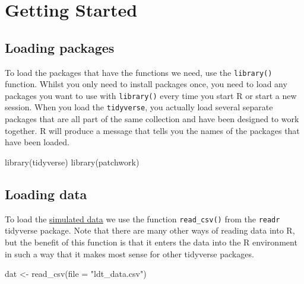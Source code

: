 \documentclass[
  english,
  doc,floatsintext]{apa6}
\newenvironment{Shaded}{\begin{snugshade}}{\end{snugshade}}
\newcommand{\AttributeTok}[1]{\textcolor[rgb]{0.77,0.63,0.00}{#1}}
\newcommand{\FunctionTok}[1]{\textcolor[rgb]{0.00,0.00,0.00}{#1}}
\newcommand{\NormalTok}[1]{#1}
\newcommand{\OtherTok}[1]{\textcolor[rgb]{0.56,0.35,0.01}{#1}}
\newcommand{\StringTok}[1]{\textcolor[rgb]{0.31,0.60,0.02}{#1}}
\begin{document}
\hypertarget{getting-started}{%
\section{Getting Started}\label{getting-started}}

\hypertarget{loading-packages}{%
\subsection{Loading packages}\label{loading-packages}}

To load the packages that have the functions we need, use the \texttt{library()} function. Whilst you only need to install packages once, you need to load any packages you want to use with \texttt{library()} every time you start R or start a new session. When you load the \texttt{tidyverse}, you actually load several separate packages that are all part of the same collection and have been designed to work together. R will produce a message that tells you the names of the packages that have been loaded.

\begin{Shaded}
\begin{Highlighting}[]
\FunctionTok{library}\NormalTok{(tidyverse)}
\FunctionTok{library}\NormalTok{(patchwork)}
\end{Highlighting}
\end{Shaded}

\hypertarget{loading-data}{%
\subsection{Loading data}\label{loading-data}}

To load the \href{https://osf.io/bj83f/files/}{simulated data} we use the function \texttt{read\_csv()} from the \texttt{readr} tidyverse package. Note that there are many other ways of reading data into R, but the benefit of this function is that it enters the data into the R environment in such a way that it makes most sense for other tidyverse packages.

\begin{Shaded}
\begin{Highlighting}[]
\NormalTok{dat }\OtherTok{\textless{}{-}} \FunctionTok{read\_csv}\NormalTok{(}\AttributeTok{file =} \StringTok{"ldt\_data.csv"}\NormalTok{)}
\end{Highlighting}
\end{Shaded}
\end{document}
